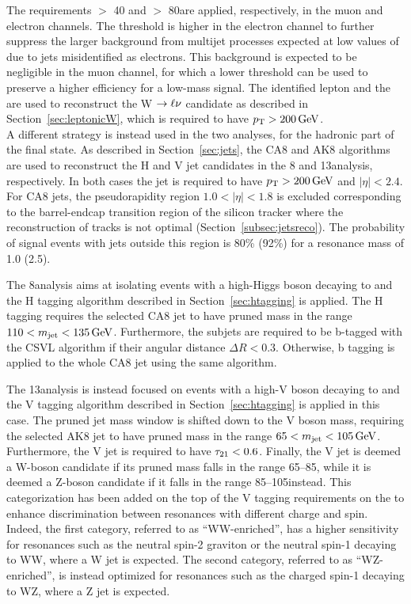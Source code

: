 The requirements \ETmiss $>$ 40 and $>$ 80\GeV are applied, respectively, in the muon and electron channels.
The threshold is higher in the electron channel to further suppress the larger background from multijet processes expected at low values of \ETmiss due to jets misidentified as electrons.
This background is expected to be negligible in the muon channel, for which a lower \ETmiss threshold can be used to preserve a higher efficiency for a low-mass signal.
The identified lepton and the \ETmiss are used to reconstruct the W $\rightarrow\ell\nu$ candidate as described in Section~\ref{sec:leptonicW},
which is required to have $p_{\mathrm{T}} > 200\,\text{Ge\hspace{-.08em}V}$.\\

A different strategy is instead used in the two analyses, for the hadronic part of the final state.
As described in Section~\ref{sec:jets}, the CA8 and AK8 algorithms are used to reconstruct the H and V jet candidates in the 8 and 13\TeV analysis, respectively.
In both cases the jet is required to have $p_{\mathrm{T}} > 200\,\text{Ge\hspace{-.08em}V}$ and $|\eta| < 2.4$. %
For CA8 jets, the pseudorapidity region $1.0 < |\eta| < 1.8$ is excluded corresponding to the barrel-endcap transition region of the silicon tracker where the reconstruction of tracks is not optimal (Section~\ref{subsec:jetsreco}).
The probability of signal events with jets outside this region is 80\% (92\%) for a resonance mass of 1.0 (2.5)\TeV.

The 8\TeV analysis aims at isolating events with a high-\pt Higgs boson decaying to \bbbar and the H tagging algorithm described in Section~\ref{sec:htagging} is applied.
The H tagging requires the selected CA8 jet to have pruned mass in the range $110 < m_{\text{jet}} < 135\,\text{Ge\hspace{-.08em}V}$. Furthermore, the subjets are required to be b-tagged with the CSVL algorithm if their angular distance $\Delta R < 0.3$.
Otherwise, b tagging is applied to the whole CA8 jet using the same algorithm.

The 13\TeV analysis is instead focused on events with a high-\pt V boson decaying to \qqbar and the V tagging algorithm described in Section~\ref{sec:htagging} is applied in this case.
The pruned jet mass window is shifted down to the V boson mass, requiring the selected AK8 jet to have pruned mass in the range $65 < m_{\text{jet}} < 105\,\text{Ge\hspace{-.08em}V}$.
Furthermore, the V jet is required to have $\tau_{21} < 0.6$.
Finally, the V jet is deemed a W-boson candidate if its pruned mass falls in the range 65--85\GeV, while it is deemed a Z-boson candidate if it falls in the range 85--105\GeV instead.
This categorization has been added on the top of the V tagging requirements on the \mJ to enhance discrimination between resonances with different charge and spin. 
Indeed, the first category, referred to as  ``WW-enriched'', has a higher sensitivity for resonances such as the neutral spin-2 graviton or the neutral spin-1 \Zpr decaying to WW, where a W jet is expected.
The second category, referred to as ``WZ-enriched'', is instead optimized for resonances such as the charged spin-1 \Wpr decaying to WZ, where a Z jet is expected.\\

